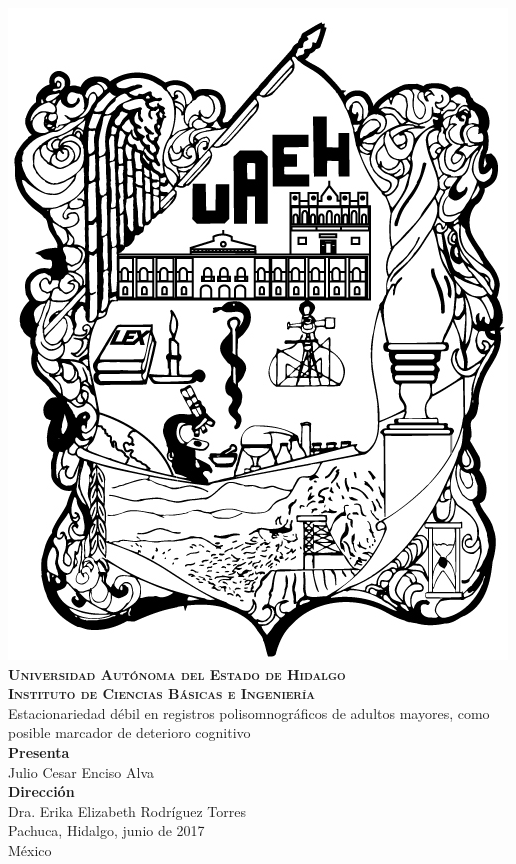\documentclass[12pt,letterpaper]{mitthesis}
\begin{document}
{
\begin{center}
    \includegraphics[width=0.2\linewidth]{./img_oficiales/logo_uaeh.png}\\
    {\Large \textbf{ \textsc{
        Universidad Aut\'onoma del Estado de Hidalgo\\
        Instituto de Ciencias B\'asicas e Ingenier\'ia\\
        }}
    \vspace*{3.5em}
    }
    {\huge
        Estacionariedad d\'ebil en registros polisomnogr\'aficos de adultos mayores,
        como posible marcador de deterioro cognitivo\\
    \vspace*{2.5em}
    }
    {\large
        \textbf{Presenta}\\
        \vspace*{.25em}}
        {\Large
        Julio Cesar Enciso Alva\\
        \vspace*{4em}
        }
        {\large
        \textbf{Direcci\'on}\\
        \vspace*{.25em}}
        {\Large
        Dra. Erika Elizabeth Rodr\'iguez Torres\\
    \vspace*{4em}
    }
    {\large
    Pachuca, Hidalgo, junio de 2017\\
    M\'exico
    }
\end{center}
}

\newpage


\setcounter{page}{1}
\end{document}
